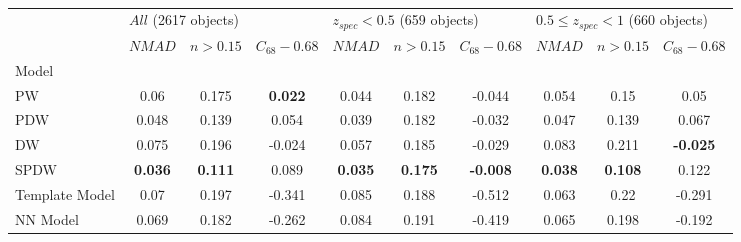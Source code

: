 \documentclass[fleqn,usenatbib]{mnras}
\begin{document}
\begin{table}
	\begin{tabular}{lccccccccc}
            \hline
            {} & \multicolumn{3}{l}{$All$ (2617 objects)} & \multicolumn{3}{l}{$z_{spec} < 0.5$ (659 objects)} & \multicolumn{3}{l}{$0.5 \leq z_{spec} < 1$ (660 objects)} \\
            {} &               $NMAD$ &        $n>0.15$ & $C_{68} - 0.68$ &                         $NMAD$ &        $n>0.15$ &  $C_{68} - 0.68$ &                                $NMAD$ &        $n>0.15$ &  $C_{68} - 0.68$ \\
            Model          &                      &                 &                 &                                &                 &                  &                                       &                 &                  \\
            \hline
            PW             &                 0.06 &           0.175 &  \textbf{0.022} &                          0.044 &           0.182 &           -0.044 &                                 0.054 &            0.15 &             0.05 \\
            PDW            &                0.048 &           0.139 &           0.054 &                          0.039 &           0.182 &           -0.032 &                                 0.047 &           0.139 &            0.067 \\
            DW             &                0.075 &           0.196 &          -0.024 &                          0.057 &           0.185 &           -0.029 &                                 0.083 &           0.211 &  \textbf{-0.025} \\
            SPDW           &       \textbf{0.036} &  \textbf{0.111} &           0.089 &                 \textbf{0.035} &  \textbf{0.175} &  \textbf{-0.008} &                        \textbf{0.038} &  \textbf{0.108} &            0.122 \\
            Template Model &                 0.07 &           0.197 &          -0.341 &                          0.085 &           0.188 &           -0.512 &                                 0.063 &            0.22 &           -0.291 \\
            NN Model       &                0.069 &           0.182 &          -0.262 &                          0.084 &           0.191 &           -0.419 &                                 0.065 &           0.198 &           -0.192 \\
            \hline
            \end{tabular}
            \caption{}
\end{table}
\end{document}
